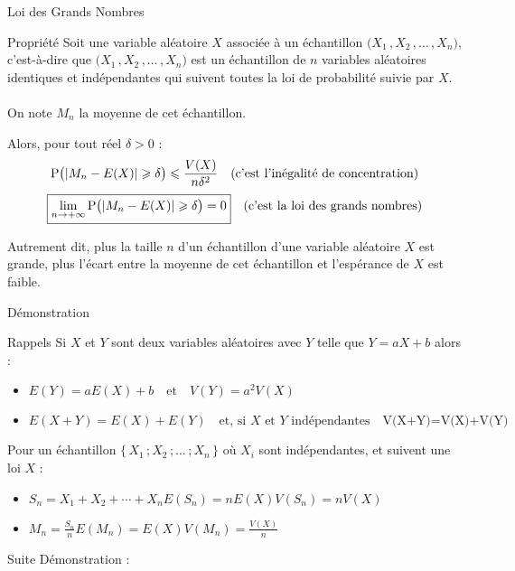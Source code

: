 \documentclass{cours}
\begin{document}
    \begin{Gpartie}{Loi des Grands Nombres}
        \vspace*{-2ex}
        \begin{Spartie}{Propriété} 
            Soit une variable aléatoire $X$ associée à un échantillon $\big(X_1\,, X_2\,,\dotsc\,, X_n\big)$, c'est-à-dire que $\big(X_1\,, X_2\,,\dotsc\,, X_n\big)$ est un échantillon de $n$ variables aléatoires identiques et indépendantes qui suivent toutes la loi de probabilité suivie par $X$. \ \\ On note $M_n$ la moyenne de cet échantillon. 
            
            Alors, pour tout réel $\delta>0$ : \[\mathrm{P}\big(\lvert M_n-E(X)\rvert\geqslant\delta\big)\leqslant\frac{V(X)}{n\delta^2}\quad\text{(c'est l'inégalité de concentration)}\]\[\boxed{\lim\limits_{n\to +\infty}\mathrm{P}\big(\lvert M_n-E(X)\rvert\geqslant\delta\big)=0}\quad\text{(c'est la loi des grands nombres)}\]

            Autrement dit, plus la taille $n$ d'un échantillon d'une variable aléatoire $X$ est grande, plus l'écart entre la moyenne de cet échantillon et l'espérance de $X$ est faible.
            \begin{SSpartie}{Démonstration} 
                \vspace*{-2ex}
                \begin{SSSpartie}{Rappels} 
                    Si $X$ et $Y$ sont deux variables aléatoires avec $Y$ telle que $Y=aX+b$ alors :
                    \begin{itemize}
                        \item $E(Y)=aE(X)+b\quad\text{et}\quad V(Y)=a^2V(X)$
                        \item $E(X+Y)=E(X)+E(Y)\quad\text{et, si $X$ et $Y$ indépendantes}\quad \mbox{V(X+Y)=V(X)+V(Y)}$
                    \end{itemize}

                    Pour un échantillon $\big\{\,X_1\,; X_2\,;\dotso\,; X_n\,\big\}$ où $X_i$ sont indépendantes, et suivent une loi $X$ :
                    \begin{itemize}
                        \item $S_n=X_1+X_2+\dotsb+X_n$\quad$E\left(S_n\right)=nE(X)$\quad$V\left(S_n\right)=nV(X)$
                        \item $M_n=\frac{S_n}{n}$\quad$E\left(M_n\right)=E(X)$\quad$V\left(M_n\right)=\frac{V(X)}{n}$
                    \end{itemize}
                \end{SSSpartie}
                Suite Démonstration :


\end{SSpartie}
\end{Spartie}
\end{Gpartie}
\end{document}
